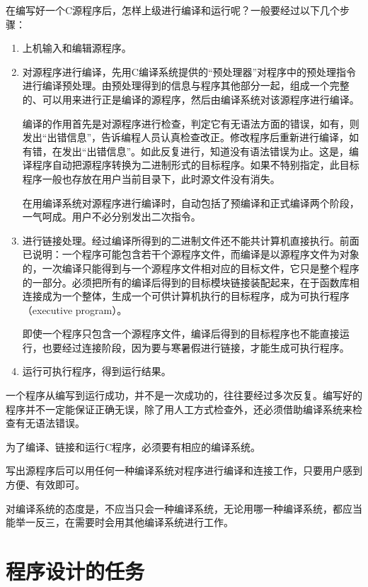  在编写好一个C源程序后，怎样上级进行编译和运行呢？一般要经过以下几个步骤：
\begin{enumerate}
	\item 	上机输入和编辑源程序。
	\item 对源程序进行编译，先用C编译系统提供的“预处理器”对程序中的预处理指令进行编译预处理。由预处理得到的信息与程序其他部分一起，组成一个完整的、可以用来进行正是编译的源程序，然后由编译系统对该源程序进行编译。

 编译的作用首先是对源程序进行检查，判定它有无语法方面的错误，如有，则发出“出错信息”，告诉编程人员认真检查改正。修改程序后重新进行编译，如有错，在发出“出错信息”。如此反复进行，知道没有语法错误为止。这是，编译程序自动把源程序转换为二进制形式的目标程序。如果不特别指定，此目标程序一般也存放在用户当前目录下，此时源文件没有消失。

 在用编译系统对源程序进行编译时，自动包括了预编译和正式编译两个阶段，一气呵成。用户不必分别发出二次指令。

	\item 进行链接处理。经过编译所得到的二进制文件还不能共计算机直接执行。前面已说明：一个程序可能包含若干个源程序文件，而编译是以源程序文件为对象的，一次编译只能得到与一个源程序文件相对应的目标文件，它只是整个程序的一部分。必须把所有的编译后得到的目标模块链接装配起来，在于函数库相连接成为一个整体，生成一个可供计算机执行的目标程序，成为可执行程序（executive program）。

 即使一个程序只包含一个源程序文件，编译后得到的目标程序也不能直接运行，也要经过连接阶段，因为要与寒暑假进行链接，才能生成可执行程序。
	\item 运行可执行程序，得到运行结果。
\end{enumerate}

 一个程序从编写到运行成功，并不是一次成功的，往往要经过多次反复。编写好的程序并不一定能保证正确无误，除了用人工方式检查外，还必须借助编译系统来检查有无语法错误。

 为了编译、链接和运行C程序，必须要有相应的编译系统。

 写出源程序后可以用任何一种编译系统对程序进行编译和连接工作，只要用户感到方便、有效即可。

 对编译系统的态度是，不应当只会一种编译系统，无论用哪一种编译系统，都应当能举一反三，在需要时会用其他编译系统进行工作。

\section{程序设计的任务}

